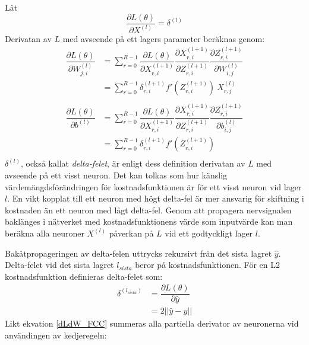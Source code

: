 \documentclass[a4paper,11pt,twoside]{article}
\newcommand*{\pd}[2]{\ensuremath{\dfrac{\partial #1}{\partial #2}}}
\newcommand*{\inpd}[2]{\ensuremath{\frac{\partial #1}{\partial #2}}}
\begin{document}
Låt
\begin{equation}
\inpd{L(\theta)}{X^{(l)}} = \delta^{(l)}
\end{equation}
Derivatan av $L$ med avseende på ett lagers parameter beräknas genom: \cite{cs231n}
\begin{equation}\label{dLdW_FCC}
\begin{split}
\pd{L(\theta)}{W^{(l)}_{j,i}} 
	& = \sum^{R-1}_{r=0} \pd{L(\theta)}{X^{(l+1)}_{r,i}} \pd{X^{(l+1)}_{r,i}}{Z^{(l+1)}_{r,i}} \pd{Z^{(l+1)}_{r,i}}{W^{(l)}_{i,j}} \\
	& = \sum^{R-1}_{r=0} \delta^{(l+1)}_{r,i} f'(Z^{(l+1)}_{r,i}) \ X^{(l)}_{r,j}\\
\end{split}
\end{equation}
\begin{equation}\label{dLdb_FCC}
\begin{split}
\pd{L(\theta)}{b^{(l)}} 
	& = \sum^{R-1}_{r=0} \pd{L(\theta)}{X^{(l+1)}_{r,i}} \pd{X^{(l+1)}_{r,i}}{Z^{(l+1)}_{r,i}} \pd{Z^{(l+1)}_{r,i}}{b^{(l)}_{i,j}} \\
	& = \sum^{R-1}_{r=0} \delta^{(l+1)}_{r,i} f'(Z^{(l+1)}_{r,i}) \\
\end{split}
\end{equation}
$\delta^{(l)}$, också kallat \textit{delta-felet}, är enligt dess definition derivatan av $L$ med avseende på ett visst neuron. Det kan tolkas som hur känslig värdemängdsförändringen för kostnadsfunktionen är för ett visst neuron vid lager $l$. En vikt kopplat till ett neuron med högt delta-fel är mer ansvarig för skiftning i kostnaden än ett neuron med lågt delta-fel. Genom att propagera nervsignalen baklänges i nätverket med kostnadsfunktionens värde som inputvärde kan man beräkna alla neuroner $X^{(l)}$ påverkan på $L$ vid ett godtyckligt lager $l$. \cite{cs231n}

Bakåtpropageringen av delta-felen uttrycks rekursivt från det sista lagret $\hat{y}$. Delta-felet vid det sista lagret $l_{sista}$ beror på kostnadsfunktionen. För en L2 kostnadsfunktion definieras delta-felet som: \cite{cs231n}
\begin{equation}
\begin{split}
\delta^{(l_{sista})}
	& = \pd{L(\theta)}{\hat{y}}  \\
	& = 2 ||\hat{y}-y||
\end{split}
\end{equation}
Likt ekvation \eqref{dLdW_FCC} summeras alla  partiella derivator av neuronerna vid användingen av kedjeregeln: \cite{cs231n}
\end{document}

